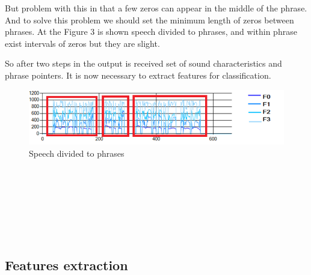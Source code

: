 \documentclass[12pt, letterpaper]{article}
\begin{document}
But problem with this in that a few zeros can appear in the middle of the phrase. And to solve this problem we should set the minimum length of zeros between phrases. At the Figure 3 is shown speech divided to phrases, and within phrase exist intervals of zeros but they are slight. 

So after two steps in the output is received set of sound characteristics and phrase pointers. It is now necessary to extract features for classification.
\begin{figure}
	\centering
		\includegraphics[scale=1]{images/phrases.png}
	\caption{Speech divided to phrases}
	\label{fig:phrases}
\end{figure}
\\
\\
\\
\\
\\
\\

\subsection{Features extraction}
\end{document}
